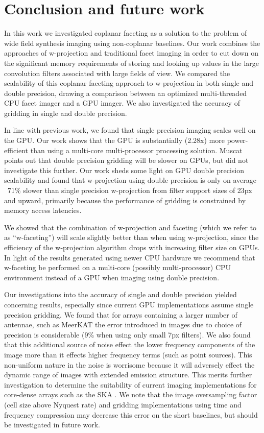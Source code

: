 \chapter{Conclusion and future work}
In this work we investigated coplanar faceting as a solution to the problem of wide field synthesis imaging using non-coplanar baselines.
Our work combines the approaches of w-projection and traditional facet imaging in order to cut down on the significant memory requirements of 
storing and looking up values in the large convolution filters associated with large fields of view. We compared the scalability of this coplanar
faceting approach to w-projection in both single and double precision, drawing a comparison between an optimized multi-threaded CPU facet imager and a 
GPU imager. We also investigated the accuracy of gridding in single and double precision.

In line with previous work, we found that single precision imaging scales well on the GPU. Our work shows that the GPU is substantially (2.28x) more 
power-efficient than using a multi-core multi-processor processing solution. Muscat \cite{muscat2014high} points out that double precision 
gridding will be slower on GPUs, but did not investigate this further. Our work sheds some light on GPU double precision scalability and found that w-projection
using double precision is only on average ~71\% slower than single precision w-projection from filter support sizes of 23px and upward, primarily because 
the performance of gridding is constrained by memory access latencies. 

We showed that the combination of w-projection and faceting (which we refer to as ``w-faceting'') will scale slightly better than when using w-projection, 
since the efficiency of the w-projection algorithm drops with increasing filter size on GPUs. In light of the results generated using newer CPU hardware we recommend that w-faceting be
performed on a multi-core (possibly multi-processor) CPU environment instead of a GPU when imaging using double precision.

Our investigations into the accuracy of single and double precision yielded concerning results, especially since current GPU implementations assume single precision gridding. We found
that for arrays containing a larger number of antennae, such as MeerKAT the error introduced in images due to choice of precision is considerable (9\% when using only small 7px filters). 
We also found that this additional source of noise effect the lower frequency components of the image more than it effects higher frequency terms (such as point sources). This 
non-uniform nature in the noise is worrisome because it will adversely effect the dynamic range of images with extended emission structure. This merits further investigation
to determine the suitability of current imaging implementations for core-dense arrays such as the SKA \cite{skaconfig}. We note that the image oversampling factor 
(cell size above Nyquest rate) and gridding implementations using time and frequency compression may decrease this error on the short baselines, but should be investigated 
in future work.

